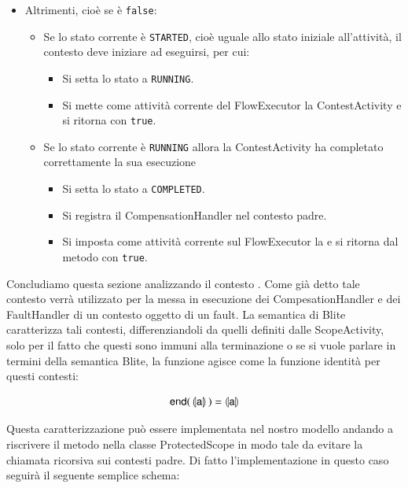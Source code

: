 \begin{itemize}
  \item Altrimenti, cioè se  è \texttt{false}:
  	\begin{itemize}
  		\item Se lo stato corrente \`e \texttt{STARTED}, cioè uguale allo stato
  		iniziale all'attività, il contesto deve iniziare ad eseguirsi, per cui:
  			\begin{itemize} 
                \item Si setta lo stato a \texttt{RUNNING}.
                \item Si mette come attività corrente del FlowExecutor la
                ContestActivity e si ritorna con \texttt{true}.
        	\end{itemize}   
  		\item Se lo stato corrente \`e \texttt{RUNNING} allora la ContestActivity
  		ha completato correttamente la sua esecuzione
  			\begin{itemize} 
                \item Si setta lo stato a \texttt{COMPLETED}. 
                \item Si registra il CompensationHandler nel contesto padre.
                \item Si imposta come attività corrente sul FlowExecutor la
                 e si ritorna dal metodo con
                \texttt{true}.
        	\end{itemize}  		 
	\end{itemize}
\end{itemize} 


Concludiamo questa sezione analizzando il contesto . Come
già detto tale contesto verrà utilizzato per la messa in esecuzione dei
CompesationHandler e dei FaultHandler di un contesto oggetto di un fault.
La semantica di Blite caratterizza tali contesti, differenziandoli da quelli
definiti dalle ScopeActivity, solo per il fatto che questi sono immuni alla
terminazione o se si vuole parlare in termini della semantica Blite, la
funzione {} agisce come la funzione identità per questi
contesti:

$$
\sf{ end( \, \llparenthesis a \rrparenthesis \, ) = \llparenthesis a
\rrparenthesis }
$$
 
Questa caratterizzazione può essere implementata nel nostro modello andando a
riscrivere il metodo  nella classe ProtectedScope in
modo tale da evitare la chiamata ricorsiva sui contesti padre. Di fatto
l'implementazione in questo caso seguirà il seguente semplice schema:

